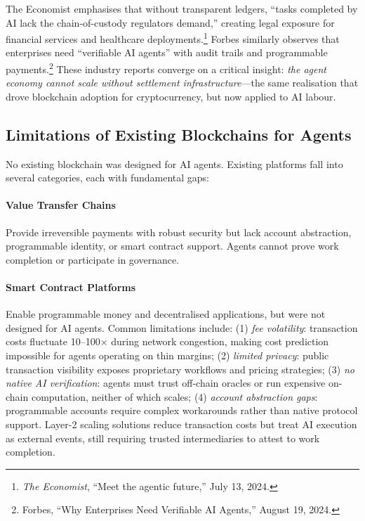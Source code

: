 \documentclass[11pt]{article}
\begin{document}
The Economist emphasises that without transparent ledgers, ``tasks completed by AI lack the chain-of-custody regulators demand,'' creating legal exposure for financial services and healthcare deployments.\footnote{\emph{The Economist}, ``Meet the agentic future,'' July 13, 2024.} Forbes similarly observes that enterprises need ``verifiable AI agents'' with audit trails and programmable payments.\footnote{Forbes, ``Why Enterprises Need Verifiable AI Agents,'' August 19, 2024.} These industry reports converge on a critical insight: \emph{the agent economy cannot scale without settlement infrastructure}---the same realisation that drove blockchain adoption for cryptocurrency, but now applied to AI labour.

\subsection{Limitations of Existing Blockchains for Agents}
No existing blockchain was designed for AI agents. Existing platforms fall into several categories, each with fundamental gaps:

\paragraph{Value Transfer Chains} Provide irreversible payments with robust security but lack account abstraction, programmable identity, or smart contract support. Agents cannot prove work completion or participate in governance.

\paragraph{Smart Contract Platforms} Enable programmable money and decentralised applications, but were not designed for AI agents. Common limitations include: (1) \emph{fee volatility}: transaction costs fluctuate 10--100$\times$ during network congestion, making cost prediction impossible for agents operating on thin margins; (2) \emph{limited privacy}: public transaction visibility exposes proprietary workflows and pricing strategies; (3) \emph{no native AI verification}: agents must trust off-chain oracles or run expensive on-chain computation, neither of which scales; (4) \emph{account abstraction gaps}: programmable accounts require complex workarounds rather than native protocol support. Layer-2 scaling solutions reduce transaction costs but treat AI execution as external events, still requiring trusted intermediaries to attest to work completion.
\end{document}
